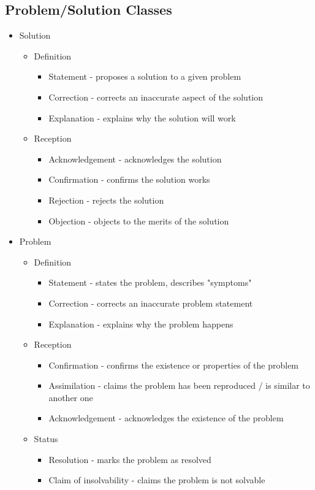 \documentclass[11pt]{article}
\begin{document}
\subsection{Problem/Solution Classes}

\begin{itemize}
	\item Solution
		\begin{itemize}
			\item Definition
				\begin{itemize}
					\item Statement - proposes a solution to a given problem
					\item Correction - corrects an inaccurate aspect of the solution
					\item Explanation - explains why the solution will work
				\end{itemize}
			\item Reception
				\begin{itemize}
					\item Acknowledgement - acknowledges the solution
					\item Confirmation - confirms the solution works
					\item Rejection - rejects the solution
					\item Objection - objects to the merits of the solution
				\end{itemize}
		\end{itemize}
	\item Problem
		\begin{itemize}
			\item Definition
				\begin{itemize}
					\item Statement - states the problem, describes "symptoms"
					\item Correction - corrects an inaccurate problem statement
					\item Explanation - explains why the problem happens
				\end{itemize}
			\item Reception
				\begin{itemize}
					\item Confirmation - confirms the existence or properties of the problem
					\item Assimilation - claims the problem has been reproduced / is similar to another one
					\item Acknowledgement - acknowledges the existence of the problem
				\end{itemize}
			\item Status
				\begin{itemize}
					\item Resolution - marks the problem as resolved
					\item Claim of insolvability - claims the problem is not solvable
				\end{itemize}
		\end{itemize}
\end{itemize}



\end{document}
